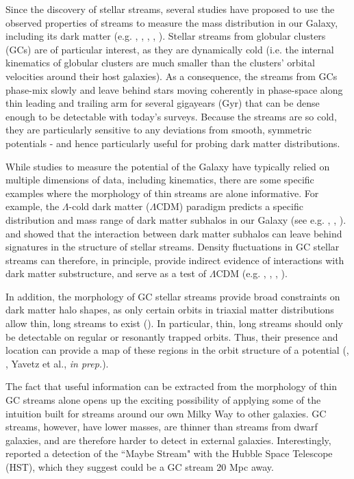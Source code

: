 \documentclass[twocolumn]{aastex62}
\begin{document}
Since the discovery of stellar streams, several studies have proposed to use the observed properties of streams to measure the mass distribution in our Galaxy, including its dark matter (e.g. \citealt{johnston99}, \citealt{koposov10}, \citealt{law10}, \citealt{sanderson15}, \citealt{bovy16}). Stellar streams from globular clusters (GCs) are of particular interest, as they are dynamically cold (i.e. the internal kinematics of globular clusters are much smaller than the clusters' orbital velocities around their host galaxies). As a consequence, the streams from GCs phase-mix slowly and leave behind stars moving coherently in phase-space along thin leading and trailing arm for several gigayears (Gyr) that can be dense enough to be detectable with today's surveys. 
Because the streams are so cold, they are particularly sensitive to any deviations from smooth, symmetric potentials - and hence particularly useful for probing dark matter distributions.

While studies to measure the potential of the Galaxy have typically relied on multiple dimensions of data, including kinematics, there are some specific examples where the morphology of thin streams are alone informative. For example, the $\Lambda$-cold dark matter ($\Lambda$CDM) paradigm predicts a specific distribution and mass range of dark matter subhalos in our Galaxy (see e.g. \citealt{diemand08}, \citealt{bovy17}, \citealt{bonaca19}). \citet{ibata02} and \citet{johnston02} showed that the interaction between dark matter subhalos can leave behind signatures in the structure of stellar streams. Density fluctuations in GC stellar streams can therefore, in principle, provide indirect evidence of interactions with dark matter substructure, and serve as a test of $\Lambda$CDM (e.g. \citealt{yoon11}, \citealt{erkal16}, \citealt{bovy17}, \citealt{bonaca19}).

In addition, the morphology of GC stellar streams provide broad constraints on  dark matter halo shapes, as only certain orbits in triaxial matter distributions allow thin, long streams to exist (\citealt{pearson15}). In particular, thin, long streams should only be detectable on regular or resonantly trapped orbits. Thus, their presence and location can provide a map of these regions in the orbit structure of a potential (\citealt{pearson15}, \citealt{price16}, Yavetz et al., {\it in prep.}).

The fact that useful information can be extracted from the morphology of thin GC streams alone opens up the exciting possibility of applying some of the intuition built for streams around our own Milky Way to other galaxies.  GC streams, however, have lower masses, are thinner than streams from dwarf galaxies, and are therefore harder to detect in external galaxies. Interestingly, \citet{abraham18} reported a detection of the ``Maybe Stream" with the Hubble Space Telescope (HST), which they suggest could be a GC stream 20 Mpc away. 
\end{document}
